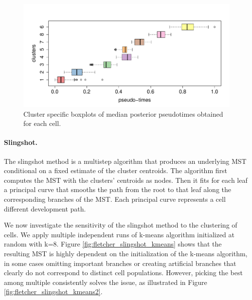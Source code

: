 \begin{figure}[!ht]
  \centering
  \includegraphics[scale = 0.4]{Img/fletcher/bp_pseudotime_new.pdf}
\caption{Cluster specific boxplots of median posterior pseudotimes obtained for each cell.}
\label{fig:fletcher_boxplot}
\end{figure}

\paragraph*{Slingshot.} The slingshot method is a multistep algorithm that produces an underlying MST conditional on a fixed estimate of the cluster centroids. The algorithm first computes the MST with the clusters' centroids as nodes. Then it fits for each leaf a principal curve that smooths the path from the root to that leaf along the corresponding branches of the MST. Each principal curve represents a cell different development path.

We now investigate the sensitivity of the slingshot method to the clustering of cells. We apply multiple independent runs of k-means algorithm initialized at random with k=8. Figure \ref{fig:fletcher_slingshot_kmeans} shows that the resulting MST is highly dependent on the initialization of the k-means algorithm, in some cases omitting important branches or creating artificial branches that clearly do not correspond to distinct cell populations. However, picking the best among multiple consistently solves the issue, as illustrated in Figure \ref{fig:fletcher_slingshot_kmeans2}.

